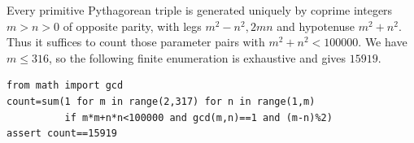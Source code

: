 Every primitive Pythagorean triple is generated uniquely by coprime integers $m>n>0$ of opposite parity, with legs $m^2-n^2,2mn$ and hypotenuse $m^2+n^2$. Thus it suffices to count those parameter pairs with $m^2+n^2<100000$. We have $m\le316$, so the following finite enumeration is exhaustive and gives $\boxed{15919}$.
\begin{verbatim}
from math import gcd
count=sum(1 for m in range(2,317) for n in range(1,m)
          if m*m+n*n<100000 and gcd(m,n)==1 and (m-n)%2)
assert count==15919
\end{verbatim}
